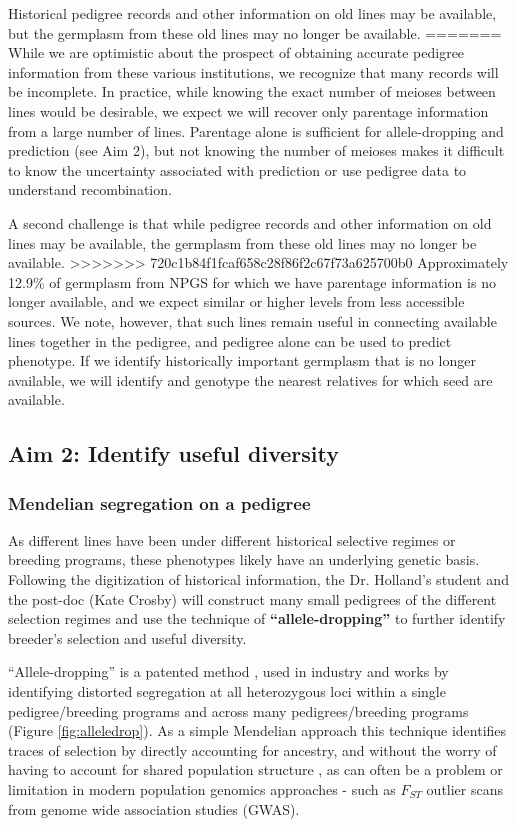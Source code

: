 \documentclass[12pt]{article}
\begin{document}
Historical pedigree records and other information on old lines may be available, but the germplasm from these old lines may no longer be available. 
=======
While we are optimistic about the prospect of obtaining accurate pedigree information from these various institutions, we recognize that many records will be incomplete. 
In practice, while knowing the exact number of meioses between lines would be desirable, we expect we will recover only parentage information from a large number of lines. 
Parentage alone is sufficient for allele-dropping and prediction (see Aim 2), but not knowing the number of meioses makes it difficult to know the uncertainty associated with prediction or use pedigree data to understand recombination.
 
A second challenge is that while pedigree records and other information on old lines may be available, the germplasm from these old lines may no longer be available. 
>>>>>>> 720c1b84f1fcaf658c28f86f2c67f73a625700b0
Approximately 12.9\% of germplasm from NPGS for which we have parentage information is no longer available, and we expect similar or higher levels from less accessible sources. 
We note, however, that such lines remain useful in connecting available lines together in the pedigree, and pedigree alone can be used to predict phenotype. 
If we identify historically important germplasm that is no longer available, we will identify and genotype the nearest relatives for which seed are available. 

\subsection*{Aim 2: Identify useful diversity}

\subsubsection*{Mendelian segregation on a pedigree}
As different lines have been under different historical selective regimes or breeding programs, these phenotypes likely have an underlying genetic basis. Following the digitization of historical information, the Dr. Holland's student and the post-doc (Kate Crosby) will construct many small pedigrees of the different selection regimes and use the technique of \textbf{``allele-dropping''} to further identify breeder's selection and useful diversity. 

``Allele-dropping'' is a patented method \citep{sebastian1995method}, used in industry and works by identifying distorted segregation at all heterozygous loci within a single pedigree/breeding programs and across many pedigrees/breeding programs (Figure \ref{fig:alleledrop}). 
As a simple Mendelian approach this technique identifies traces of selection by directly accounting for ancestry, and without the worry of having to account for shared population structure \cite{sebastian1995method}, as can often be a problem or limitation in modern population genomics approaches - such as $F_{ST}$ outlier scans from genome wide association studies (GWAS). 
\end{document}

